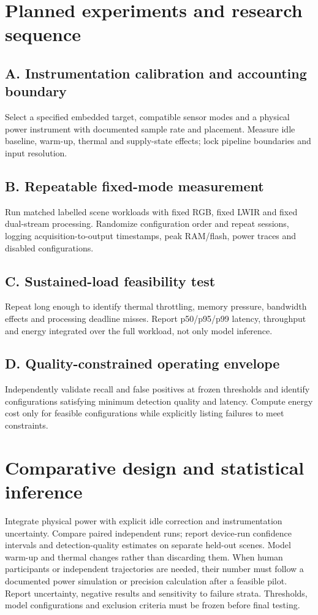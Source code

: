 \documentclass[11pt,a4paper]{article}
\begin{document}
\section{Planned experiments and research sequence}
\subsection{A. Instrumentation calibration and accounting boundary}
Select a specified embedded target, compatible sensor modes and a physical power instrument with documented sample rate and placement. Measure idle baseline, warm-up, thermal and supply-state effects; lock pipeline boundaries and input resolution.

\subsection{B. Repeatable fixed-mode measurement}
Run matched labelled scene workloads with fixed RGB, fixed LWIR and fixed dual-stream processing. Randomize configuration order and repeat sessions, logging acquisition-to-output timestamps, peak RAM/flash, power traces and disabled configurations.

\subsection{C. Sustained-load feasibility test}
Repeat long enough to identify thermal throttling, memory pressure, bandwidth effects and processing deadline misses. Report p50/p95/p99 latency, throughput and energy integrated over the full workload, not only model inference.

\subsection{D. Quality-constrained operating envelope}
Independently validate recall and false positives at frozen thresholds and identify configurations satisfying minimum detection quality and latency. Compute energy cost only for feasible configurations while explicitly listing failures to meet constraints.

\section{Comparative design and statistical inference}
Integrate physical power with explicit idle correction and instrumentation uncertainty. Compare paired independent runs; report device-run confidence intervals and detection-quality estimates on separate held-out scenes. Model warm-up and thermal changes rather than discarding them. When human participants or independent trajectories are needed, their number must follow a documented power simulation or precision calculation after a feasible pilot. Report uncertainty, negative results and sensitivity to failure strata. Thresholds, model configurations and exclusion criteria must be frozen before final testing.
\end{document}
